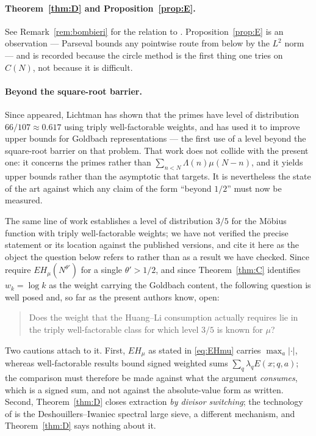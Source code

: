\documentclass[11pt,a4paper]{article}
\theoremstyle{plain}
\theoremstyle{definition}
\begin{document}
\paragraph{Theorem~\ref{thm:D} and Proposition~\ref{prop:E}.} See
Remark~\ref{rem:bombieri} for the relation to \cite{Bom76}.
Proposition~\ref{prop:E} is an observation --- Parseval bounds any
pointwise route from below by the $L^2$ norm --- and is recorded because
the circle method is the first thing one tries on $C(N)$, not because it
is difficult.

\paragraph{Beyond the square-root barrier.} Since \cite{HL} appeared,
Lichtman \cite{Li23} has shown that the primes have level of
distribution $66/107 \approx 0.617$ using triply well-factorable
weights, and has used it to improve upper bounds for Goldbach
representations --- the first use of a level beyond the square-root
barrier on that problem. That work does not collide with the present
one: it concerns the primes rather than
$\sum_{n<N}\Lambda(n)\mu(N-n)$, and it yields upper bounds rather than
the asymptotic that \cite{HL} targets. It is nevertheless the state of
the art against which any claim of the form ``beyond $1/2$'' must now be
measured.

The same line of work \cite{Li20,Li23} establishes a level of
distribution $3/5$ for the M\"obius function with triply
well-factorable weights; we have not verified the precise statement or
its location against the published versions, and cite it here as the
object the question below refers to rather than as a result we have
checked. Since
\cite{HL} require $EH_\mu(N^{\theta'})$ for a single $\theta'>1/2$, and
since Theorem~\ref{thm:C} identifies $w_k=\log k$ as the weight carrying
the Goldbach content, the following question is well posed and, so far
as the present authors know, open:

\begin{quote}
Does the weight that the Huang--Li consumption actually requires lie in
the triply well-factorable class for which level $3/5$ is known for
$\mu$?
\end{quote}

Two cautions attach to it. First, $EH_\mu$ as stated in \eqref{eq:EHmu}
carries $\max_a|\cdot|$, whereas well-factorable results bound signed
weighted sums $\sum_q \lambda_q E(x;q,a)$; the comparison must therefore
be made against what the argument \emph{consumes}, which is a signed
sum, and not against the absolute-value form as written. Second,
Theorem~\ref{thm:D} closes extraction \emph{by divisor switching}; the
technology of \cite{Li23} is the Deshouillers--Iwaniec spectral large
sieve, a different mechanism, and Theorem~\ref{thm:D} says nothing about
it.
\end{document}
